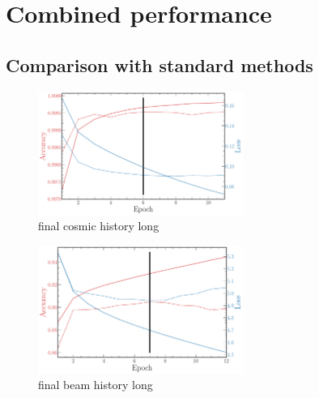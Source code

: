 \section{Combined performance} %
\label{sec:cvn_final} %

\subsection{Comparison with standard methods} %
\label{sec:cvn_final_comparison} %

\begin{figure} %
    \includegraphics[width=0.6\textwidth]{diagrams/6-cvn/chipsnet/final_cosmic_history.pdf}
    \caption[final cosmic history short]
    {final cosmic history long}
    \label{fig:final_cosmic_history}
\end{figure}

\begin{figure} %
    \includegraphics[width=0.6\textwidth]{diagrams/6-cvn/chipsnet/final_beam_history.pdf}
    \caption[final beam history short]
    {final beam history long}
    \label{fig:final_beam_history}
\end{figure}

